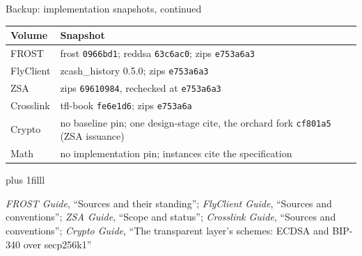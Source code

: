 \documentclass[aspectratio=169,11pt]{beamer}
\newcommand{\src}[1]{\par\vskip0pt plus 1filll
  {\fontsize{6}{7.2}\selectfont\color{arbdim}\raggedright #1\par}}
\begin{document}
\begin{frame}{Backup: implementation snapshots, continued}
\begin{center}\small
\begin{tabular}{@{}ll@{}}
\toprule
Volume & Snapshot \\
\midrule
FROST & \textsf{frost} \texttt{0966bd1}; \textsf{reddsa}
  \texttt{63c6ac0}; \textsf{zips} \texttt{e753a6a3} \\
FlyClient & \textsf{zcash\_history} 0.5.0; \textsf{zips}
  \texttt{e753a6a3} \\
ZSA & \textsf{zips} \texttt{69610984}, rechecked at \texttt{e753a6a3} \\
Crosslink & tfl-book \texttt{fe6e1d6}; \textsf{zips} \texttt{e753a6a} \\
Crypto & no baseline pin; one design-stage cite, the \textsf{orchard}
  fork \texttt{cf801a5} (ZSA issuance) \\
Math & no implementation pin; instances cite the specification \\
\bottomrule
\end{tabular}
\end{center}
\src{\emph{FROST Guide}, ``Sources and their standing''; \emph{FlyClient Guide},
``Sources and conventions''; \emph{ZSA Guide}, ``Scope and status'';
\emph{Crosslink Guide}, ``Sources and conventions''; \emph{Crypto Guide}, ``The
transparent layer's schemes: ECDSA and BIP-340 over secp256k1''}
\end{frame}
\end{document}
